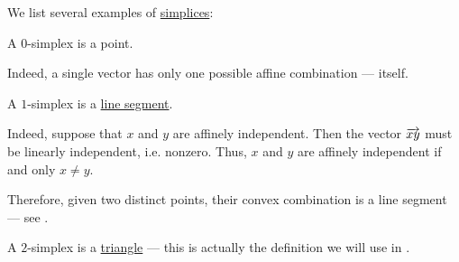 \begin{example}\label{ex:def:simplex}
  We list several examples of \hyperref[def:simplex]{simplices}:
  \begin{thmenum}
     A \( 0 \)-simplex is a point.

    Indeed, a single vector has only one possible affine combination --- itself.

     A \( 1 \)-simplex is a \hyperref[def:line_segment]{line segment}.

    Indeed, suppose that \( x \) and \( y \) are affinely independent. Then the vector \( \overrightarrow{xy} \) must be linearly independent, i.e. nonzero. Thus, \( x \) and \( y \) are affinely independent if and only \( x \neq y \).

    Therefore, given two distinct points, their convex combination is a line segment --- see .

     A \( 2 \)-simplex is a \hyperref[def:triangle]{triangle} --- this is actually the definition we will use in .
  \end{thmenum}
\end{example}

